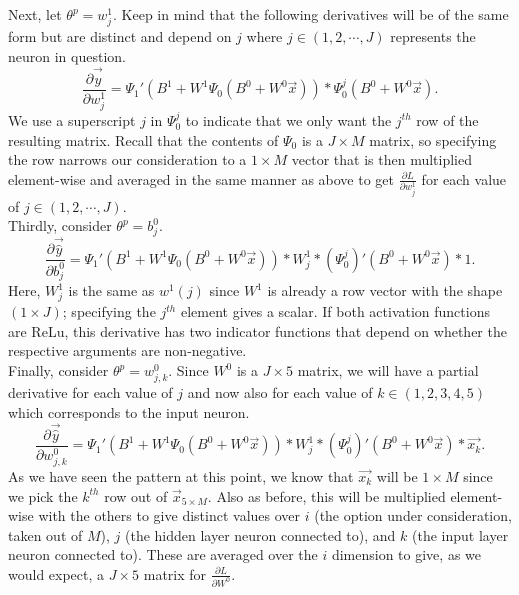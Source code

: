 \documentclass[reqno,14pt]{amsart}
\theoremstyle{plain}
\theoremstyle{definition}
\theoremstyle{remark}
\begin{document}
Next, let $\theta^p = w^1_j$. Keep in mind that the following derivatives will be of the same form but are distinct and depend on $j$ where $j\in (1, 2, \cdots, J)$ represents the neuron in question.
\begin{equation}
    \frac{\partial \overrightarrow{\hat{y}}}{\partial w^1_j} = \Psi_1'(B^1 + W^1 \Psi_0( B^0 + W^0 \overrightarrow{x} )) * \Psi^j_0( B^0 + W^0 \overrightarrow{x} ).
\end{equation}
We use a superscript $j$ in $\Psi^j_0$ to indicate that we only want the $j^{th}$ row of the resulting matrix. Recall that the contents of $\Psi_0$ is a $J \times M$ matrix, so specifying the row narrows our consideration to a $1 \times M$ vector that is then multiplied element-wise and averaged in the same manner as above to get $\frac{\partial L}{\partial w^1_j}$ for each value of $j \in (1, 2, \cdots, J)$.\\

Thirdly, consider $\theta^p = b^0_j$.
\begin{equation}
    \frac{\partial \overrightarrow{\hat{y}}}{\partial b^0_j} = \Psi_1'(B^1 + W^1 \Psi_0( B^0 + W^0 \overrightarrow{x} )) * W^1_j * (\Psi^j_0)'( B^0 + W^0 \overrightarrow{x} ) * 1.
\end{equation}
Here, $W^1_j$ is the same as $w^1(j)$ since $W^1$ is already a row vector with the shape $(1 \times J)$; specifying the $j^{th}$ element gives a scalar. If both activation functions are ReLu, this derivative has two indicator functions that depend on whether the respective arguments are non-negative.\\

Finally, consider $\theta^p = w^0_{j,k}$. Since $W^0$ is a $J \times 5$ matrix, we will have a partial derivative for each value of $j$ and now also for each value of $k \in (1, 2, 3, 4, 5)$ which corresponds to the input neuron.
\begin{equation}
    \frac{\partial \overrightarrow{\hat{y}}}{\partial w^0_{j,k}} = \Psi_1'(B^1 + W^1 \Psi_0( B^0 + W^0 \overrightarrow{x} )) * W^1_j * (\Psi^j_0)'( B^0 + W^0 \overrightarrow{x} ) * \overrightarrow{x_k}.
\end{equation}
As we have seen the pattern at this point, we know that $\overrightarrow{x_k}$ will be $1 \times M$ since we pick the $k^{th}$ row out of $\overrightarrow{x}_{5 \times M}$. Also as before, this will be multiplied element-wise with the others to give distinct values over $i$ (the option under consideration, taken out of $M$), $j$ (the hidden layer neuron connected to), and $k$ (the input layer neuron connected to). These are averaged over the $i$ dimension to give, as we would expect, a $J \times 5$ matrix for $\frac{\partial L}{\partial W^0}$.\\
\end{document}
